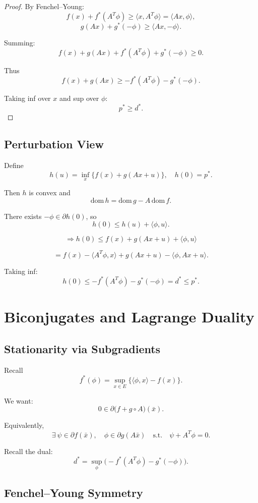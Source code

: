 \documentclass[12pt,oneside]{book}
\numberwithin{equation}{section}
\theoremstyle{definition}
\theoremstyle{plain}
\theoremstyle{remark}
\begin{document}
\begin{proof}
By Fenchel--Young:
\[
f(x) + f^*(A^T\phi) \ge \langle x, A^T\phi\rangle = \langle Ax,\phi\rangle,
\]
\[
g(Ax) + g^*(-\phi) \ge \langle Ax,-\phi\rangle.
\]

Summing:
\[
f(x)+g(Ax)+f^*(A^T\phi)+g^*(-\phi)\ge 0.
\]

Thus
\[
f(x)+g(Ax) \ge -f^*(A^T\phi)-g^*(-\phi).
\]

Taking inf over $x$ and sup over $\phi$:
\[
p^* \ge d^*.
\]
\end{proof}

\subsection*{Perturbation View}

Define
\[
h(u) = \inf_x \{f(x) + g(Ax + u)\}, \quad h(0)=p^*.
\]

Then $h$ is convex and
\[
\mathrm{dom}\,h = \mathrm{dom}\,g - A\,\mathrm{dom}\,f.
\]

There exists $-\phi \in \partial h(0)$, so
\[
h(0) \le h(u) + \langle \phi,u\rangle.
\]

\[
\Rightarrow
h(0) \le f(x) + g(Ax+u) + \langle \phi,u\rangle
\]

\[
= f(x) - \langle A^T\phi,x\rangle + g(Ax+u) - \langle \phi,Ax+u\rangle.
\]

Taking inf:
\[
h(0) \le -f^*(A^T\phi) - g^*(-\phi) = d^* \le p^*.
\]

\section{Biconjugates and Lagrange Duality}

\subsection{Stationarity via Subgradients}

Recall
\[
f^*(\phi) = \sup_{x\in E} \{\langle \phi,x\rangle - f(x)\}.
\]

We want:
\[
0 \in \partial \big(f + g \circ A\big)(\bar{x}).
\]

Equivalently,
\[
\exists \ \psi \in \partial f(\bar{x}), \quad \phi \in \partial g(A\bar{x})
\quad \text{s.t.} \quad
\psi + A^T \phi = 0.
\]

Recall the dual:
\[
d^* = \sup_\phi \big( -f^*(A^T\phi) - g^*(-\phi) \big).
\]

\subsection{Fenchel--Young Symmetry}
\end{document}
